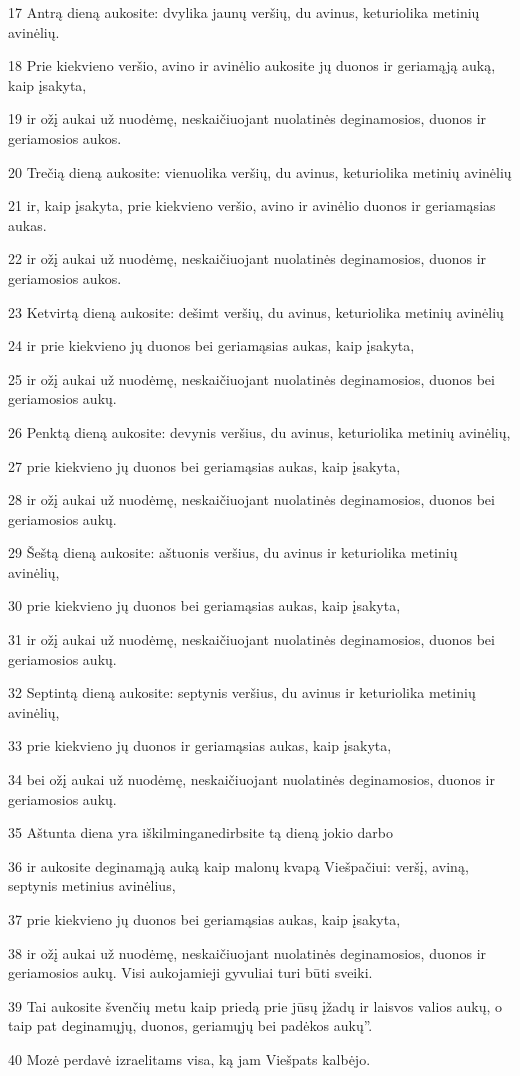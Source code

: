 \par 17 Antrą dieną aukosite: dvylika jaunų veršių, du avinus, keturiolika metinių avinėlių. 
\par 18 Prie kiekvieno veršio, avino ir avinėlio aukosite jų duonos ir geriamąją auką, kaip įsakyta, 
\par 19 ir ožį aukai už nuodėmę, neskaičiuojant nuolatinės deginamosios, duonos ir geriamosios aukos. 
\par 20 Trečią dieną aukosite: vienuolika veršių, du avinus, keturiolika metinių avinėlių 
\par 21 ir, kaip įsakyta, prie kiekvieno veršio, avino ir avinėlio duonos ir geriamąsias aukas. 
\par 22 ir ožį aukai už nuodėmę, neskaičiuojant nuolatinės deginamosios, duonos ir geriamosios aukos. 
\par 23 Ketvirtą dieną aukosite: dešimt veršių, du avinus, keturiolika metinių avinėlių 
\par 24 ir prie kiekvieno jų duonos bei geriamąsias aukas, kaip įsakyta, 
\par 25 ir ožį aukai už nuodėmę, neskaičiuojant nuolatinės deginamosios, duonos bei geriamosios aukų. 
\par 26 Penktą dieną aukosite: devynis veršius, du avinus, keturiolika metinių avinėlių, 
\par 27 prie kiekvieno jų duonos bei geriamąsias aukas, kaip įsakyta, 
\par 28 ir ožį aukai už nuodėmę, neskaičiuojant nuolatinės deginamosios, duonos bei geriamosios aukų. 
\par 29 Šeštą dieną aukosite: aštuonis veršius, du avinus ir keturiolika metinių avinėlių, 
\par 30 prie kiekvieno jų duonos bei geriamąsias aukas, kaip įsakyta, 
\par 31 ir ožį aukai už nuodėmę, neskaičiuojant nuolatinės deginamosios, duonos bei geriamosios aukų. 
\par 32 Septintą dieną aukosite: septynis veršius, du avinus ir keturiolika metinių avinėlių, 
\par 33 prie kiekvieno jų duonos ir geriamąsias aukas, kaip įsakyta, 
\par 34 bei ožį aukai už nuodėmę, neskaičiuojant nuolatinės deginamosios, duonos ir geriamosios aukų. 
\par 35 Aštunta diena yra iškilminga­nedirbsite tą dieną jokio darbo 
\par 36 ir aukosite deginamąją auką kaip malonų kvapą Viešpačiui: veršį, aviną, septynis metinius avinėlius, 
\par 37 prie kiekvieno jų duonos bei geriamąsias aukas, kaip įsakyta, 
\par 38 ir ožį aukai už nuodėmę, neskaičiuojant nuolatinės deginamosios, duonos ir geriamosios aukų. Visi aukojamieji gyvuliai turi būti sveiki. 
\par 39 Tai aukosite švenčių metu kaip priedą prie jūsų įžadų ir laisvos valios aukų, o taip pat deginamųjų, duonos, geriamųjų bei padėkos aukų”. 
\par 40 Mozė perdavė izraelitams visa, ką jam Viešpats kalbėjo.



